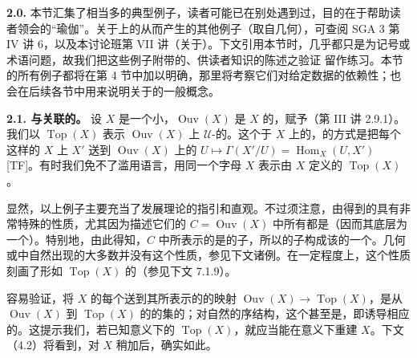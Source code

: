 \textbf{2.0.} 本节汇集了相当多的典型例子，读者可能已在别处遇到过，目的在于帮助读者领会的“瑜伽”。关于上的从而产生的其他例子（取自几何），可查阅 SGA 3 第 IV 讲 6，以及本讨论班第 VII 讲（关于）。下文引用本节时，几乎都只是为记号或术语问题，故我们把这些例子附带的、供读者知识的陈述之验证
留作练习。本节的所有例子都将在第 4 节中加以明确，那里将考察它们对给定数据的依赖性；也会在后续各节中用来说明关于的一般概念。

\textbf{2.1. 与关联的。} 设 $X$ 是一个小，$\operatorname{Ouv}(X)$ 是 $X$ 的，赋予（第 III 讲 2.9.1）。我们以 $\operatorname{Top}(X)$ 表示 $\operatorname{Ouv}(X)$ 上 $\mathcal U$-的。这个于 $X$ 上的，的方式是把每个这样的 $X$ 上 $X'$ 送到 $\operatorname{Ouv}(X)$ 上的 $U\mapsto\Gamma(X'/U)=\operatorname{Hom}_X(U,X')$ [TF]。有时我们免不了滥用语言，用同一个字母 $X$ 表示由 $X$ 定义的 $\operatorname{Top}(X)$。

显然，以上例子主要充当了发展理论的指引和直观。不过须注意，由得到的具有非常特殊的性质，尤其因为描述它们的 $C=\operatorname{Ouv}(X)$ 中所有都是（因而其底层为一个）。特别地，由此得知，$C$ 中所表示的是的子，所以的子构成该的一个。几何或中自然出现的大多数并没有这个性质，参见下文诸例。在一定程度上，这个性质刻画了形如 $\operatorname{Top}(X)$ 的（参见下文 7.1.9）。

容易验证，将 $X$ 的每个送到其所表示的的映射 $\operatorname{Ouv}(X)\to\operatorname{Top}(X)$，是从 $\operatorname{Ouv}(X)$ 到 $\operatorname{Top}(X)$ 的的集的；对自然的序结构，这个甚至是，即诱导相应的。这提示我们，若已知意义下的 $\operatorname{Top}(X)$，就应当能在意义下重建 $X$。下文（4.2）将看到，对 $X$ 稍加后，确实如此。

